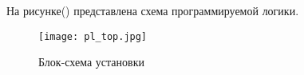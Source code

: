 На рисунке() представлена схема программируемой логики. 
\begin{figure}[ht]
    \centering
    \texttt{[image: pl\_top.jpg]}
    \caption{Блок-схема установки}
    \label{fig:mpr}
\end{figure}

